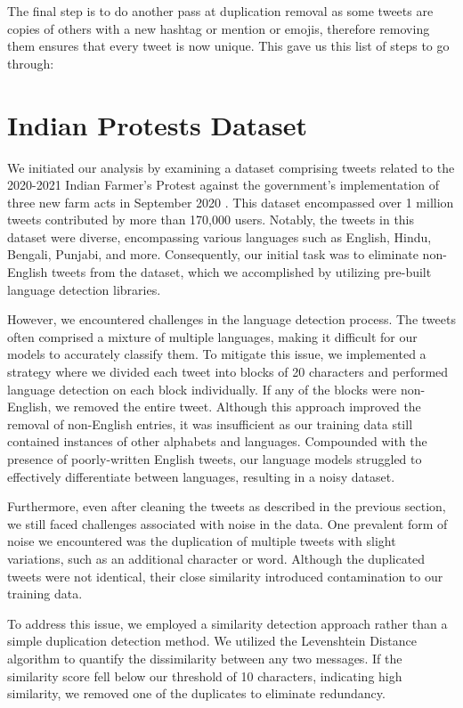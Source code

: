 The final step is to do another pass at duplication removal as some tweets are copies of others with a new hashtag or mention or emojis, therefore removing them ensures that every tweet is now unique. This gave us this list of steps to go through:

\section{Indian Protests Dataset}
We initiated our analysis by examining a dataset comprising tweets related to the 2020-2021 Indian Farmer's Protest against the government's implementation of three new farm acts in September 2020 \cite{indian-protest-dataset}. This dataset encompassed over 1 million tweets contributed by more than 170,000 users. Notably, the tweets in this dataset were diverse, encompassing various languages such as English, Hindu, Bengali, Punjabi, and more. Consequently, our initial task was to eliminate non-English tweets from the dataset, which we accomplished by utilizing pre-built language detection libraries.

However, we encountered challenges in the language detection process. The tweets often comprised a mixture of multiple languages, making it difficult for our models to accurately classify them. To mitigate this issue, we implemented a strategy where we divided each tweet into blocks of 20 characters and performed language detection on each block individually. If any of the blocks were non-English, we removed the entire tweet. Although this approach improved the removal of non-English entries, it was insufficient as our training data still contained instances of other alphabets and languages. Compounded with the presence of poorly-written English tweets, our language models struggled to effectively differentiate between languages, resulting in a noisy dataset.

Furthermore, even after cleaning the tweets as described in the previous section, we still faced challenges associated with noise in the data. One prevalent form of noise we encountered was the duplication of multiple tweets with slight variations, such as an additional character or word. Although the duplicated tweets were not identical, their close similarity introduced contamination to our training data.

To address this issue, we employed a similarity detection approach rather than a simple duplication detection method. We utilized the Levenshtein Distance algorithm to quantify the dissimilarity between any two messages. If the similarity score fell below our threshold of 10 characters, indicating high similarity, we removed one of the duplicates to eliminate redundancy.

